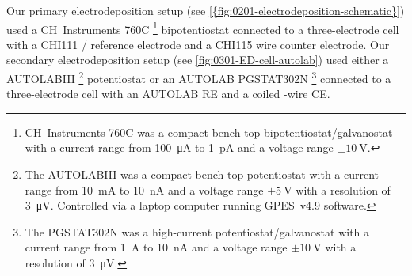 \documentclass[webedition,openright,titles,swedish,english]{LuaUUThesis}\usepackage[]{graphicx}\usepackage[]{xcolor}
\begin{document}
Our primary electrodeposition setup (see \cref{{fig:0201-electrodeposition-schematic}})
used a CH~Instruments 760C%
\footnote{%
   CH~Instruments 760C was a compact bench-top bipotentiostat/galvanostat
   with a current range from \qty{100}{\micro\ampere} to \qty{1}{\pico\ampere} and a
   voltage range $\pm\qty{10}{\volt}$.
}
bipotentiostat connected to a three-electrode cell with
a CHI111 / reference electrode
and a CHI115  wire counter electrode.
Our secondary electrodeposition setup (see \cref{fig:0301-ED-cell-autolab})
used either a {\textmu}AUTOLABIII%
\footnote{%
   The {\textmu}AUTOLABIII was a compact bench-top potentiostat with
   a current range from \qty{10}{\milli\ampere} to \qty{10}{\nano\ampere} and a
   voltage range $\pm\qty{5}{\volt}$ with a resolution of \qty{3}{\micro\volt}.
   Controlled via a laptop computer running GPES~v4.9 software.
}
potentiostat or an AUTOLAB PGSTAT302N%
\footnote{%
   The PGSTAT302N was a high-current potentiostat/galvanostat with
   a current range from \qty{1}{\ampere} to \qty{10}{\nA} and a
   voltage range $\pm\qty{10}{\volt}$ with a resolution of \qty{3}{\micro\volt}.
}
connected to a three-electrode cell with an AUTOLAB \gls{RE}
and a coiled -wire \gls{CE}.
\end{document}
